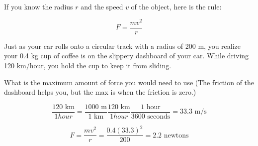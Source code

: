 If you know the radius $r$ and the speed $v$ of the object, here is the rule:

$$F = \frac{m v^2}{r}$$

\begin{Exercise}[title={Circular Motion}, label=circular]
Just as your car rolls onto a circular track with a radius of 200 m,
you realize your 0.4 kg cup of coffee is on the slippery dashboard of your
car.  While driving 120 km/hour, you hold the cup to keep it from sliding.

What is the maximum amount of force you would need to use (The friction of
the dashboard helps you, but the max is when the friction is zero.)

\end{Exercise}
\begin{Answer}[ref=circular]
  $$\frac{120 \text{ km}}{1 hour} = \frac{1000 \text{ m}}{1 \text{ km}}\frac{120 \text{ km}}{1 hour} \frac{1 \text{ hour}}{3600 \text{ seconds}}= 33.3 \text{ m/s}$$

  $$F = \frac{m v^2}{r} = \frac {0.4 (33.3)^2}{200} = 2.2 \text{ newtons}$$
\end{Answer}
